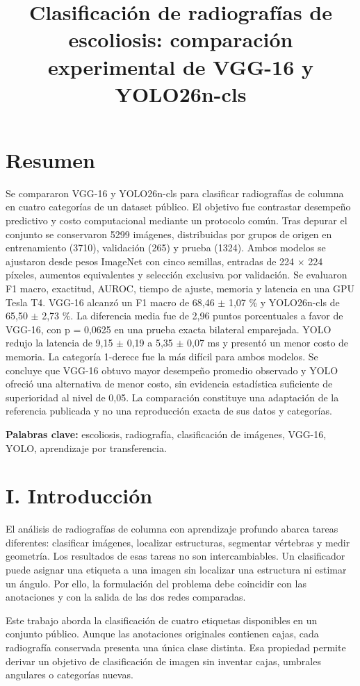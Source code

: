 \documentclass[conference]{IEEEtran}
\title{Clasificación de radiografías de escoliosis: comparación experimental de VGG-16 y YOLO26n-cls}
\author{\IEEEauthorblockN{Yefrey Sneyder Sanchez Alba}\IEEEauthorblockA{Asignatura: Inteligencia artificial\\Universidad Simón Bolívar, sede Cúcuta}}
\begin{document}
\maketitle
\section*{Resumen}
Se compararon VGG-16 y YOLO26n-cls para clasificar radiografías de columna en cuatro categorías de un dataset público. El objetivo fue contrastar desempeño predictivo y costo computacional mediante un protocolo común. Tras depurar el conjunto se conservaron 5299 imágenes, distribuidas por grupos de origen en entrenamiento (3710), validación (265) y prueba (1324). Ambos modelos se ajustaron desde pesos ImageNet con cinco semillas, entradas de 224 $\times$ 224 píxeles, aumentos equivalentes y selección exclusiva por validación. Se evaluaron F1 macro, exactitud, AUROC, tiempo de ajuste, memoria y latencia en una GPU Tesla T4. VGG-16 alcanzó un F1 macro de 68,46 $\pm$ 1,07 \% y YOLO26n-cls de 65,50 $\pm$ 2,73 \%. La diferencia media fue de 2,96 puntos porcentuales a favor de VGG-16, con p = 0,0625 en una prueba exacta bilateral emparejada. YOLO redujo la latencia de 9,15 $\pm$ 0,19 a 5,35 $\pm$ 0,07 ms y presentó un menor costo de memoria. La categoría 1-derece fue la más difícil para ambos modelos. Se concluye que VGG-16 obtuvo mayor desempeño promedio observado y YOLO ofreció una alternativa de menor costo, sin evidencia estadística suficiente de superioridad al nivel de 0,05. La comparación constituye una adaptación de la referencia publicada y no una reproducción exacta de sus datos y categorías.

\textbf{Palabras clave:} escoliosis, radiografía, clasificación de imágenes, VGG-16, YOLO, aprendizaje por transferencia.

\section*{I. Introducción}
El análisis de radiografías de columna con aprendizaje profundo abarca tareas diferentes: clasificar imágenes, localizar estructuras, segmentar vértebras y medir geometría. Los resultados de esas tareas no son intercambiables. Un clasificador puede asignar una etiqueta a una imagen sin localizar una estructura ni estimar un ángulo. Por ello, la formulación del problema debe coincidir con las anotaciones y con la salida de las dos redes comparadas.

Este trabajo aborda la clasificación de cuatro etiquetas disponibles en un conjunto público. Aunque las anotaciones originales contienen cajas, cada radiografía conservada presenta una única clase distinta. Esa propiedad permite derivar un objetivo de clasificación de imagen sin inventar cajas, umbrales angulares o categorías nuevas.
\end{document}
